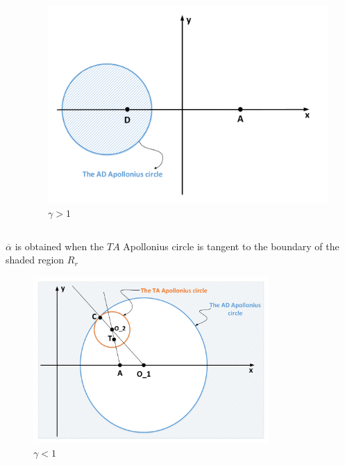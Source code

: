 \documentclass{beamer}
\begin{document}
\begin{frame}
\begin{columns}[c]
\begin{column}{.3\linewidth}
	\end{column}
	
	\begin{column}{.3\linewidth}
		\begin{figure}[H]
			\centering
			\includegraphics[scale = 0.12]{fig/drawing4_1c.pdf}
			\caption{$\gamma>1$}
		\end{figure}
	\end{column}
	
\end{columns}

\end{frame}

\begin{frame}
$\overline{\alpha}$ is obtained when the $TA$ Apollonius circle is tangent to the boundary of the shaded region $R_r$

\centering
\begin{figure}
\includegraphics[width=0.8\textwidth]{fig/drawing4_2a.pdf}
\caption {$\gamma<1$}
\label{4_g<1}
\end{figure}
\end{frame}
\end{document}
